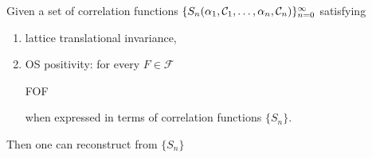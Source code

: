\documentclass[../main/main.tex]{subfiles}
\begin{document}
\begin{theorem} Given a set of correlation functions $\{S_n(\alpha_1,\mathcal C_1,\ldots,\alpha_n,\mathcal C_n)\}_{n=0}^\infty$ satisfying

\begin{enumerate}[label=(\arabic*)]
	\item lattice translational invariance,
	\item OS positivity: for every $F\in\mathcal F$
	\begin{eq}
		\langle FOF\rangle{}
	\end{eq}
	when expressed in terms of correlation functions $\{S_n\}$.
\end{enumerate}

Then one can reconstruct from $\{S_n\}$


\end{theorem}
\end{document}
